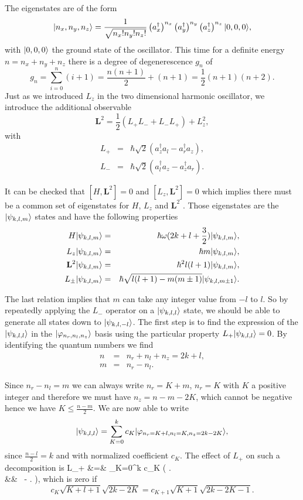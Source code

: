 The eigenstates are of the form
\[  | n_x,n_y,n_z \rangle = \frac{1}{\sqrt{n_x! n_y!n_z!}} \left( a_x^\dagger \right)^{n_x}  \left( a_y^\dagger \right)^{n_y} \left( a_z^\dagger \right)^{n_z} | 0,0,0 \rangle, \]
with $| 0,0,0 \rangle$ the ground state of the oscillator. This time for a definite energy $n=n_x+n_y+n_z$ there is a degree of degenerescence $g_n$ of
\[ g_n = \sum_{i=0}^n (i+1) = \frac{n(n+1)}{2} + (n+1) = \frac 1 2 (n+1)(n+2). \]
Just as we introduced $L_z$ in the two dimensional harmonic oscillator, we introduce the additional observable
\[ \mathbf{L}^2 = \frac 1 2 (L_+ L_- + L_- L_+) + L_z^2, \]
with
\begin{eqnarray}
    L_+ &=& \hbar \sqrt 2 (a^\dagger_z a_l - a^\dagger_r a_z), \\
    L_- &=& \hbar \sqrt 2 (a^\dagger_l a_z - a^\dagger_z a_r).
\end{eqnarray}

It can be checked that $[H,\mathbf{L}^2]=0$ and $[L_z,\mathbf{L}^2]=0$ which implies there must be a common set of eigenstates for $H$, $L_z$ and $\mathbf{L}^2$ . Those eigenstates are the $| \psi_{k,l,m} \rangle$ states and have the following properties
\begin{eqnarray}
    H | \psi_{k,l,m} \rangle &=& \hbar \omega(2k+l+\frac 3 2) | \psi_{k,l,m} \rangle,\\
    L_z | \psi_{k,l,m} \rangle &=& \hbar m | \psi_{k,l,m} \rangle,\\
    \mathbf{L}^2 | \psi_{k,l,m} \rangle &=& \hbar^2 l(l+1) | \psi_{k,l,m} \rangle, \\
    L_\pm | \psi_{k,l,m} \rangle &=& \hbar \sqrt{l(l+1)-m(m\pm1)} | \psi_{k,l,m\pm1} \rangle.
\end{eqnarray}

The last relation implies that $m$ can take any integer value from $-l$ to $l$. So by repeatedly applying the $L_-$ operator on a $| \psi_{k,l,l} \rangle$ state, we should be able to generate all states down to $| \psi_{k,l,-l} \rangle$. The first step is to find the expression of the $| \psi_{k,l,l} \rangle$ in the $| \varphi_{n_r,n_l,n_z} \rangle$ basis using the particular property $L_+ | \psi_{k,l,l} \rangle = 0$. By identifying the quantum numbers we find
\begin{eqnarray}
    n&=& n_r + n_l + n_z = 2k+ l, \\
    m &=& n_r - n_l.
\end{eqnarray}

Since $n_r-n_l=m$ we can always write $n_r = K+m$, $n_r=K$ with $K$ a positive integer and therefore we must have $n_z=n-m-2K$, which cannot be negative hence we have $K \le \frac{n-m}{2}$.  We are now able to write
\[ | \psi_{k,l,l} \rangle = \sum_{K=0}^k c_K | \varphi_{n_r=K+l, n_l=K, n_z = 2k-2K} \rangle, \]
since $\frac{n-l}{2} = k$ and with normalized coefficient $c_K$. The effect of $L_+$ on such a decomposition is
\bea
L_+  &=& \sum_{K=0}^k c_K  \hbar \left(    \right. \nonumber \\
&& \ - \left.   \right),
\eea
which is zero if
\[ c_K  \sqrt{K+l+1}\sqrt{2k-2K} = c_{K+1} \sqrt{K+1} \sqrt{2k-2K-1}. \]

